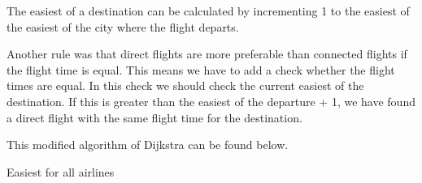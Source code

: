 \documentclass{article}
\begin{document}
The easiest of a destination can be calculated by incrementing 1 to the easiest of the easiest of the city where the flight departs.

Another rule was that direct flights are more preferable than connected flights if the flight time is equal. This means we have to add a check whether the flight times are equal. In this check we should check the current easiest of the destination. If this is greater than the easiest of the departure + 1, we have found a direct flight with the same flight time for the destination.

This modified algorithm of Dijkstra can be found below.
\begin{algorithm}[ht!]
  \DontPrintSemicolon



    \caption{Easiest for all airlines}
\end{algorithm}
\end{document}
